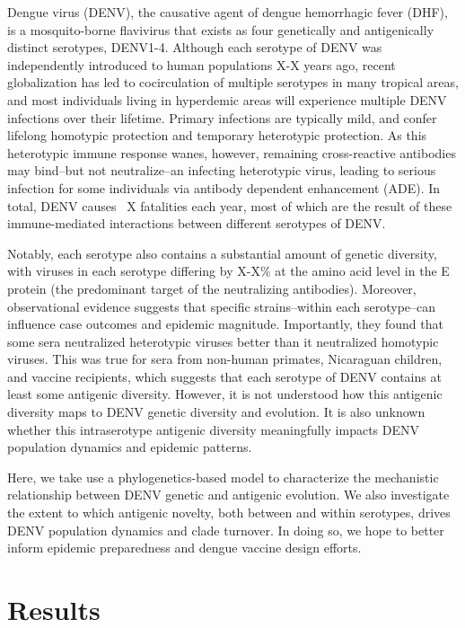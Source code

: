 \documentclass[11pt,oneside,letterpaper]{article}
\begin{document}
Dengue virus (DENV), the causative agent of dengue hemorrhagic fever (DHF), is a mosquito-borne flavivirus that exists as four genetically and antigenically distinct serotypes, DENV1-4.
Although each serotype of DENV was independently introduced to human populations X-X years ago, recent globalization has led to cocirculation of multiple serotypes in many tropical areas, and most individuals living in hyperdemic areas will experience multiple DENV infections over their lifetime.
Primary infections are typically mild, and confer lifelong homotypic protection and temporary heterotypic protection.
As this heterotypic immune response wanes, however, remaining cross-reactive antibodies may bind--but not neutralize--an infecting heterotypic virus, leading to serious infection for some individuals via antibody dependent enhancement (ADE).
In total, DENV causes ~X fatalities each year, most of which are the result of these immune-mediated interactions between different serotypes of DENV.

Notably, each serotype also contains a substantial amount of genetic diversity, with viruses in each serotype differing by X-X\% at the amino acid level in the E protein (the predominant target of the neutralizing antibodies).
Moreover, observational evidence suggests that specific strains--within each serotype--can influence case outcomes and epidemic magnitude.
Importantly, they found that some sera neutralized heterotypic viruses better than it neutralized homotypic viruses.
This was true for sera from non-human primates, Nicaraguan children, and vaccine recipients, which suggests that each serotype of DENV contains at least some antigenic diversity.
However, it is not understood how this antigenic diversity maps to DENV genetic diversity and evolution.
It is also unknown whether this intraserotype antigenic diversity meaningfully impacts DENV population dynamics and epidemic patterns.

Here, we take use a phylogenetics-based model to characterize the mechanistic relationship between DENV genetic and antigenic evolution.
We also investigate the extent to which antigenic novelty, both between and within serotypes, drives DENV population dynamics and clade turnover.
In doing so, we hope to better inform epidemic preparedness and dengue vaccine design efforts.



\section*{Results}
\end{document}
